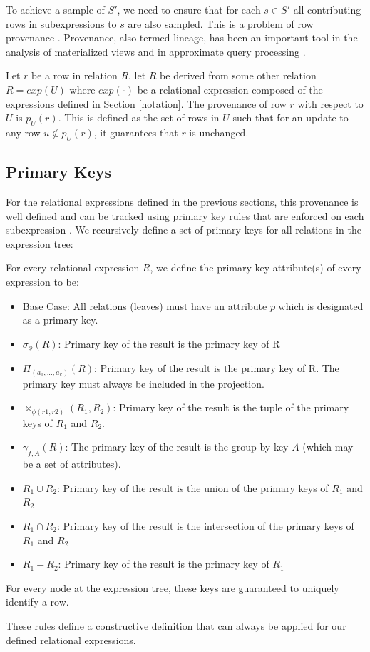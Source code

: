 To achieve a sample of $S'$, we need to ensure that for each $s \in S'$ all contributing rows in subexpressions to $s$ are also sampled. 
This is a problem of row provenance \cite{DBLP:journals/vldb/CuiW03}.
Provenance, also termed lineage, has been an important tool in the analysis of materialized views \cite{DBLP:journals/vldb/CuiW03} and in approximate query processing \cite{DBLP:conf/sigmod/ZengGMZ14}.
\begin{definition}[Provenance]\label{prov}
Let $r$ be a row in relation $R$, let $R$ be derived from some other
relation $R = exp(U)$ where $exp(\cdot)$ be a relational
expression composed of the expressions defined in Section \ref{notation}.
The provenance of row $r$ with respect to $U$ is $p_U(r)$. 
This is defined as the set of rows in $U$ such that for an update to any row $u \not\in p_U(r)$, it guarantees that $r$ is unchanged.
\end{definition}

\subsection{Primary Keys}
For the relational expressions defined in the previous sections, this provenance is well defined and can be tracked using primary key rules that are enforced on
each subexpression \cite{DBLP:journals/vldb/CuiW03}. 
We recursively define a set of primary keys for all relations in the expression tree:
\begin{definition} \label{pk}
For every relational expression $R$, we define the primary key attribute(s) of every expression to be:
\begin{itemize}[noitemsep]
\item Base Case: All relations (leaves) must have an attribute $p$ which is designated as a primary key. 
\item $\sigma_{\phi}(R)$: Primary key of the result is the primary key of R 
\item $\Pi_{(a_1,...,a_k)}(R)$: Primary key of the result is the primary key of R. The primary key must always be included in the projection.
\item $\bowtie_{\phi (r1,r2)}(R_1,R_2)$: Primary key of the result is the tuple of the primary keys of $R_1$ and $R_2$. 
\item $\gamma_{f,A}(R)$: The primary key of the result is the group by key $A$ (which may be a set of attributes).
\item $R_1 \cup R_2$: Primary key of the result is the union of the primary keys of $R_1$ and $R_2$
\item $R_1 \cap R_2$: Primary key of the result is the intersection of the primary keys of $R_1$ and $R_2$
\item $R_1 - R_2$: Primary key of the result is the primary key of $R_1$
\end{itemize}
For every node at the expression tree, these keys are guaranteed to uniquely identify a row.
\end{definition}
These rules define a constructive definition that can always be applied for our defined relational expressions. 

